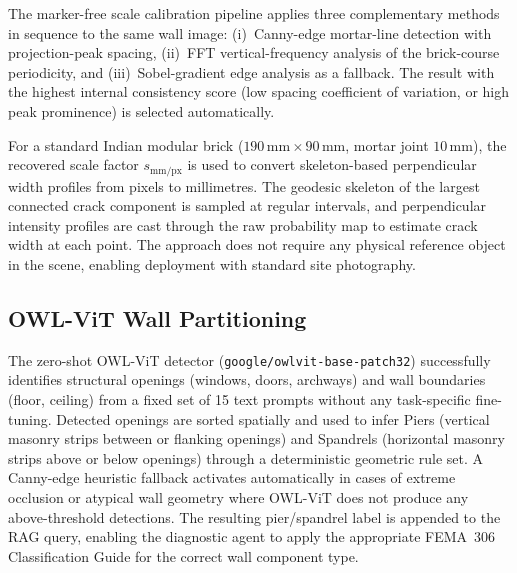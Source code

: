 \begin{sloppypar}
The marker-free scale calibration pipeline applies three complementary methods
in sequence to the same wall image: (i)~Canny-edge mortar-line detection with
projection-peak spacing, (ii)~FFT vertical-frequency analysis of the brick-course
periodicity, and (iii)~Sobel-gradient edge analysis as a fallback.
The result with the highest internal consistency score (low spacing coefficient of
variation, or high peak prominence) is selected automatically.

For a standard Indian modular brick ($190\,\mathrm{mm}\times90\,\mathrm{mm}$,
mortar joint $10\,\mathrm{mm}$), the recovered scale factor $s_{\mathrm{mm/px}}$
is used to convert skeleton-based perpendicular width profiles from pixels to
millimetres.
The geodesic skeleton of the largest connected crack component is sampled at
regular intervals, and perpendicular intensity profiles are cast through the raw
probability map to estimate crack width at each point.
The approach does not require any physical reference object in the scene, enabling
deployment with standard site photography.
\end{sloppypar}

\subsection{OWL-ViT Wall Partitioning}
\label{subsec:wall_results}

\begin{sloppypar}
The zero-shot OWL-ViT detector (\texttt{google/owlvit-base-patch32}) successfully
identifies structural openings (windows, doors, archways) and wall boundaries
(floor, ceiling) from a fixed set of 15 text prompts without any task-specific
fine-tuning.
Detected openings are sorted spatially and used to infer Piers (vertical masonry
strips between or flanking openings) and Spandrels (horizontal masonry strips
above or below openings) through a deterministic geometric rule set.
A Canny-edge heuristic fallback activates automatically in cases of extreme
occlusion or atypical wall geometry where OWL-ViT does not produce any
above-threshold detections.
The resulting pier/spandrel label is appended to the RAG query, enabling the
diagnostic agent to apply the appropriate FEMA~306 Classification Guide for the
correct wall component type.
\end{sloppypar}

